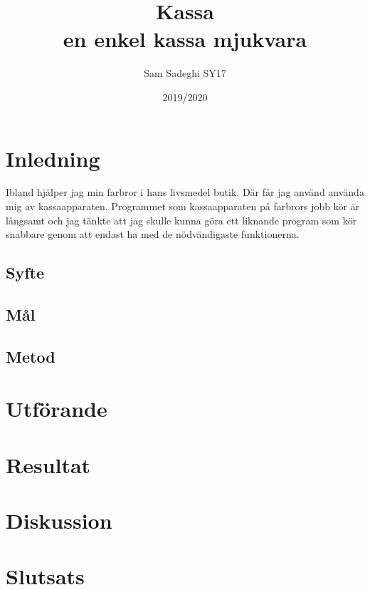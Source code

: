 \documentclass[a4paper, 12pt]{article}
\title{Kassa\\\large en enkel kassa mjukvara}
\author{Sam Sadeghi SY17}
\date{2019/2020}
\begin{document}
\begin{titlepage}
\maketitle
\end{titlepage}


\begin{abstract}

\end{abstract}
\newpage
\tableofcontents
\newpage

\section{Inledning}
Ibland hjälper jag min farbror i hans livsmedel butik. 
Där får jag använd använda mig av kassaapparaten. 
Programmet som kassaapparaten på farbrors jobb kör är långsamt och jag tänkte att jag skulle kunna göra ett liknande program som kör snabbare genom att endast ha med de nödvändigaste funktionerna.
\subsection{Syfte}

\subsection{Mål}

\subsection{Metod}

\section{Utförande}

\section{Resultat}

\section{Diskussion}

\section{Slutsats}

\newpage 

\printbibliography
\end{document}
